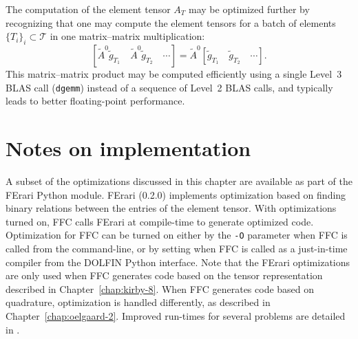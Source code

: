 The computation of the element tensor $A_T$ may be optimized further
by recognizing that\vadjust{\pagebreak} one may compute the element tensors for a batch of
elements $\{T_i\}_i \subset \mathcal{T}$ in one matrix--matrix
multiplication:
\begin{equation}
  \left[\tilde{A}^0 \tilde{g}_{T_1} \quad \tilde{A}^0 \tilde{g}_{T_2} \quad \cdots \right] =
  \tilde{A}^0 \left[\tilde{g}_{T_1} \quad \tilde{g}_{T_2} \quad \cdots\right].
\end{equation}
This matrix--matrix product may be computed efficiently using a single
Level~3 BLAS call (\texttt{dgemm}) instead of a sequence of Level~2
BLAS calls, and typically leads to better floating-point
performance.

\section{Notes on implementation}

A subset of the optimizations discussed in this chapter are available
as part of the FErari Python module. FErari
(0.2.0) implements optimization based on finding binary relations
between the entries of the element tensor. With optimizations turned
on, FFC calls FErari at compile-time to generate optimized
code. Optimization for FFC can be turned on either by the \texttt{-O}
parameter when FFC is called from the command-line, or by setting
 when FFC is
called as a just-in-time compiler from the DOLFIN Python
interface. Note that the FErari optimizations are only used when FFC
generates code based on the tensor representation described in
Chapter~\ref{chap:kirby-8}. When FFC generates code based on
quadrature, optimization is handled differently, as described in
Chapter~\ref{chap:oelgaard-2}. Improved run-times for several
problems are detailed in \citet{KirbyLogg2008}.
